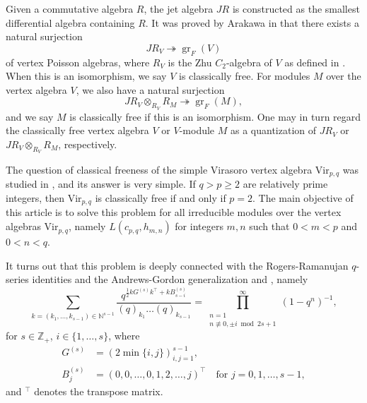 \documentclass[a4paper, 12pt, reqno]{amsart}
\theoremstyle{remark}
\DeclareMathOperator{\gr}{gr}
\newcommand{\Vir}{{\mathrm{Vir}}}
\begin{document}
Given a commutative algebra $R$, the jet algebra $JR$ is constructed as the smallest differential algebra containing $R$.
It was proved by Arakawa in \cite[Proposition 2.5.1]{arakawa_remark_2012} that there exists a natural surjection
\begin{equation*}
  JR_V \twoheadrightarrow \gr_F(V)
\end{equation*}
of vertex Poisson algebras, where $R_V$ is the Zhu $C_2$-algebra of $V$ as defined in \cite{zhu_modular_1996}.
When this is an isomorphism, we say $V$ is classically free.
For modules $M$ over the vertex algebra $V$, we also have a natural surjection
\begin{equation*}
  JR_V \otimes_{R_V} R_M \twoheadrightarrow \gr_F(M),
\end{equation*}
and we say $M$ is classically free if this is an isomorphism.
One may in turn regard the classically free vertex algebra $V$ or $V$-module $M$ as a quantization of $JR_V$ or $JR_V \otimes_{R_V} R_M$, respectively.

The question of classical freeness of the simple Virasoro vertex algebra $\Vir_{p, q}$ was studied in \cite{van_ekeren_chiral_2021}, and its answer is very simple.
If $q > p \ge 2$ are relatively prime integers, then $\Vir_{p, q}$ is classically free if and only if $p = 2$.
The main objective of this article is to solve this problem for all irreducible modules over the vertex algebras $\Vir_{p, q}$, namely $L(c_{p, q}, h_{m, n})$ for integers $m, n$ such that $0 < m < p$ and $0 < n < q$.

It turns out that this problem is deeply connected with the Rogers-Ramanujan $q$-series identities and the Andrews-Gordon generalization \cite{gordon_combinatorial_1961} and \cite{andrews_analytic_1974}, namely
\begin{equation}
  \label{eq:1}
  \sum_{k = (k_1, \dots, k_{s - 1}) \in \mathbb{N}^{s - 1}}\frac{q^{\frac{1}{2}kG^{(s)}k^\top + kB^{(s)}_{s - i}}}{(q)_{k_1}\dots(q)_{k_{s - 1}}} = \prod^\infty_{\substack{n = 1 \\ n \not\equiv 0, \pm i \bmod 2s + 1}}(1 - q^n)^{-1},
\end{equation}
for $s \in \mathbb{Z}_+$, $i \in \{1, \dots, s\}$, where
\begin{align*}
  G^{(s)} &= (2\min\{i, j\})_{i, j = 1}^{s - 1}, \\
  B^{(s)}_j &= (0, 0, \dots, 0, 1, 2, \dots, j)^\top \quad \text{for $j = 0, 1, \dots, s - 1$},
\end{align*}
and ${}^\top$ denotes the transpose matrix.
\end{document}
